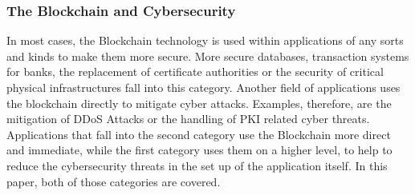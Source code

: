 \subsubsection{The Blockchain and Cybersecurity}
In most cases, the Blockchain technology is used within applications of any sorts and kinds to make them more secure. More secure databases, transaction systems for banks, the replacement of certificate authorities or the security of critical physical infrastructures fall into this category. Another field of applications uses the blockchain directly to mitigate cyber attacks. Examples, therefore, are the mitigation of DDoS Attacks or the handling of PKI related cyber threats. Applications that fall into the second category use the Blockchain more direct and immediate, while the first category uses them on a higher level, to help to reduce the cybersecurity threats in the set up of the application itself. In this paper, both of those categories are covered.